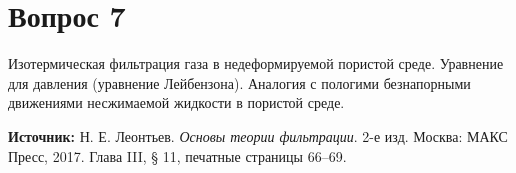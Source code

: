 \documentclass[12pt,a4paper]{article}
\begin{document}
\section*{Вопрос 7}
\noindent Изотермическая фильтрация газа в недеформируемой пористой среде. Уравнение для давления (уравнение Лейбензона). Аналогия с пологими безнапорными движениями несжимаемой жидкости в пористой среде.

\medskip
\noindent\textbf{Источник:} Н. Е. Леонтьев. \textit{Основы теории фильтрации}. 2-е изд. Москва: МАКС Пресс, 2017. Глава III, § 11, печатные страницы 66--69.
\par\bigskip

\end{document}
